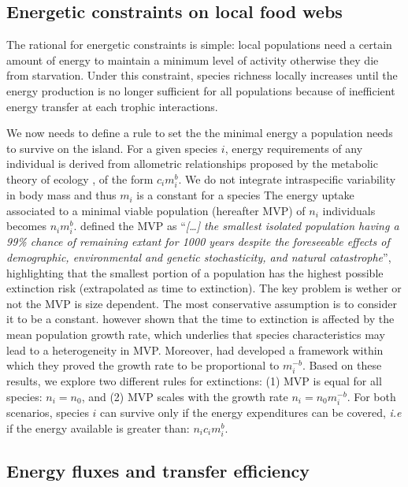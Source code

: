 \subsection{Energetic constraints on local food
webs}\label{energetic-constraints-on-local-food-webs}

The rational for energetic constraints is simple: local populations need
a certain amount of energy to maintain a minimum level of activity
otherwise they die from starvation. Under this constraint, species
richness locally increases until the energy production is no longer
sufficient for all populations because of inefficient energy transfer at
each trophic interactions.

We now needs to define a rule to set the the minimal energy a population
needs to survive on the island. For a given species \(i\), energy
requirements of any individual is derived from allometric relationships
proposed by the metabolic theory of ecology \citep{Brown2004}, of the
form \(c_im_i^b\). We do not integrate intraspecific variability in body
mass and thus \(m_i\) is a constant for a species The energy uptake
associated to a minimal viable population (hereafter MVP) of \(n_i\)
individuals becomes \(n_im_i^b\). \citet{Shaffer1981} defined the MVP as
``\emph{{[}\ldots{}{]} the smallest isolated population having a 99\%
chance of remaining extant for 1000 years despite the foreseeable
effects of demographic, environmental and genetic stochasticity, and
natural catastrophe}'', highlighting that the smallest portion of a
population has the highest possible extinction risk (extrapolated as
time to extinction). The key problem is wether or not the MVP is size
dependent. The most conservative assumption is to consider it to be a
constant. \citet{Lande1993} however shown that the time to extinction is
affected by the mean population growth rate, which underlies that
species characteristics may lead to a heterogeneity in MVP. Moreover,
\citet{Savage2004} had developed a framework within which they proved
the growth rate to be proportional to \(m_i^{-b}\). Based on these
results, we explore two different rules for extinctions: (1) MVP is
equal for all species: \(n_i=n_0\), and (2) MVP scales with the growth
rate \(n_i=n_0m_i^{-b}\). For both scenarios, species \(i\) can survive
only if the energy expenditures can be covered, \emph{i.e} if the energy
available is greater than: \(n_ic_im_i^b\).

\subsection{Energy fluxes and transfer
efficiency}\label{energy-fluxes-and-transfer-efficiency}


